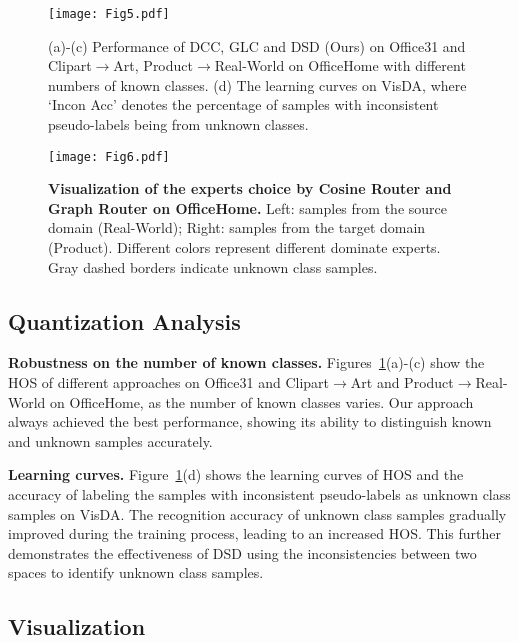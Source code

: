 \documentclass[10pt,twocolumn,letterpaper]{article}
\begin{document}
\begin{figure}[ht]  \centering
  \vspace{-0.1in}
  \texttt{[image: Fig5.pdf]}
  \caption{(a)-(c) Performance of DCC, GLC and DSD (Ours) on Office31 and Clipart$\to$Art, Product$\to$Real-World on OfficeHome with different numbers of known classes. (d) The learning curves on VisDA, where `Incon Acc' denotes the percentage of samples with inconsistent pseudo-labels being from unknown classes.} \label{fig:quan}
  \vspace{-0.1in}
\end{figure}

\begin{figure*}[h]  \centering
  \vspace{-0.12in}
  \texttt{[image: Fig6.pdf]}
  \caption{\textbf{Visualization of the experts choice by Cosine Router and Graph Router on OfficeHome.} Left: samples from the source domain (Real-World); Right: samples from the target domain (Product). Different colors represent different dominate experts. Gray dashed borders indicate unknown class samples.} \label{fig:choice}
  \vspace{-0.12in}
\end{figure*}

\subsection{Quantization Analysis}

\textbf{Robustness on the number of known classes.} Figures~\ref{fig:quan}(a)-(c) show the HOS of different approaches on Office31 and Clipart$\to$Art and Product$\to$Real-World on OfficeHome, as the number of known classes varies. Our approach always achieved the best performance, showing its ability to distinguish known and unknown samples accurately.

\textbf{Learning curves.} Figure~\ref{fig:quan}(d) shows the learning curves of HOS and the accuracy of labeling the samples with inconsistent pseudo-labels as unknown class samples on VisDA. The recognition accuracy of unknown class samples gradually improved during the training process, leading to an increased HOS. This further demonstrates the effectiveness of DSD using the inconsistencies between two spaces to identify unknown class samples.

\subsection{Visualization}
\end{document}
